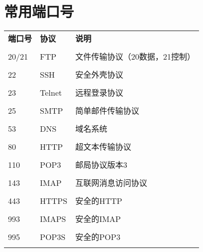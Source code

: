 \documentclass[lang=cn,newtx,10pt,scheme=chinese]{../../elegantbook}
\begin{document}
\section{常用端口号}
\begin{longtable}{@{}llp{8cm}@{}}
\toprule
\textbf{端口号} & \textbf{协议} & \textbf{说明} \\\\ \midrule
\endhead

20/21 & FTP & 文件传输协议（20数据，21控制） \\\\
22 & SSH & 安全外壳协议 \\\\
23 & Telnet & 远程登录协议 \\\\
25 & SMTP & 简单邮件传输协议 \\\\
53 & DNS & 域名系统 \\\\
80 & HTTP & 超文本传输协议 \\\\
110 & POP3 & 邮局协议版本3 \\\\
143 & IMAP & 互联网消息访问协议 \\\\
443 & HTTPS & 安全的HTTP \\\\
993 & IMAPS & 安全的IMAP \\\\
995 & POP3S & 安全的POP3 \\\\

\bottomrule
\end{longtable}

\end{document}
